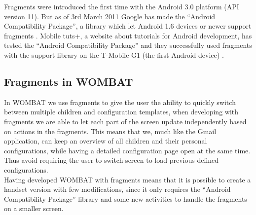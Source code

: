 Fragments were introduced the first time with the Android 3.0 platform (API version 11). 
But as of 3rd March 2011 Google has made the "`Android Compatibility Package"', a library which let Android 1.6 devices or newer support fragments \cite{web:android:fragments:support}.
Mobile tuts+, a website about tutorials for Android development, has tested the "`Android Compatibility Package"' and they successfully used fragments with the support library on the T-Mobile G1 (the first Android device) \cite{web:android:fragments:compatibility}.
 
\subsection{Fragments in WOMBAT}
In WOMBAT we use fragments to give the user the ability to quickly switch between multiple children and configuration templates, when developing with fragments we are able to let each part of the screen update independently based on actions in the fragments.
This means that we, much like the Gmail application, can keep an overview of all children and their personal configurations, while having a detailed configuration page open at the same time.
Thus avoid requiring the user to switch screen to load previous defined configurations.\\

Having developed WOMBAT with fragments means that it is possible to create a handset version with few modifications, since it only requires the "`Android Compatibility Package"' library and some new activities to handle the fragments on a smaller screen.